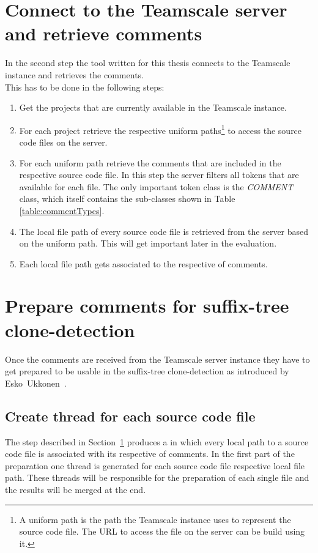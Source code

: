 \section{Connect to the Teamscale server and retrieve comments}
\label{section:retrieveComments}
In the second step the tool written for this thesis connects to the Teamscale instance and retrieves the comments.\\
This has to be done in the following steps:
\begin{enumerate}
	\item Get the projects that are currently available in the Teamscale instance. 
	\item For each project retrieve the respective uniform paths\footnote{A uniform path is the path the Teamscale instance uses to represent the source code file. The URL to access the file on the server can be build using it.} to access the source code files on the server.
	\item For each uniform path retrieve the comments that are included in the respective source code file. In this step the server filters all tokens that are available for each file. The only important token class is the \textit{COMMENT} class, which itself contains the sub-classes shown in Table \ref{table:commentTypes}.
	\item The local file path of every source code file is retrieved from the server based on the uniform path. This will get important later in the evaluation.
	\item Each local file path gets associated to the respective  of comments.
\end{enumerate}



\section{Prepare comments for suffix-tree clone-detection}
Once the comments are received from the Teamscale server instance they have to get prepared to be usable in the suffix-tree clone-detection as introduced by Esko~Ukkonen~\cite{Ukkonen1995}\cite{Ukkonen1993}.\\

\subsection{Create thread for each source code file}
The step described in Section~\ref{section:retrieveComments} produces a  in which every local path to a source code file is associated with its respective  of comments.
In the first part of the preparation one thread is generated for each source code file respective local file path. These threads will be responsible for the preparation of each single file and the results will be merged at the end.


